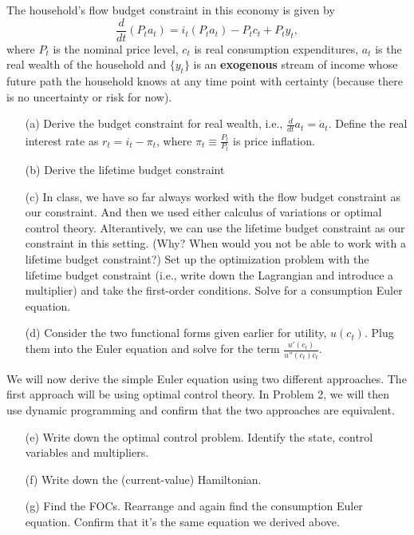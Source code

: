 \documentclass[11pt]{extarticle}
\theoremstyle{plain}
\theoremstyle{definition}
\begin{document}
The household's flow budget constraint in this economy is given by
\begin{equation*}
	\frac{d}{dt}(P_t a_t) = i_t (P_t a_t) - P_t c_t + P_t y_t,
\end{equation*}
where $P_t$ is the nominal price level, $c_t$ is real consumption expenditures, $a_t$ is the real wealth of the household and $\{y_t\}$ is an \textbf{exogenous} stream of income whose future path the household knows at any time point with certainty (because there is no uncertainty or risk for now).


\vspace{5mm}
\begin{enumerate}
\item [(a)] Derive the budget constraint for real wealth, i.e., $\frac{d}{dt} a_t = \dot a_t$. Define the real interest rate as $r_t = i_t - \pi_t$, where $\pi_t \equiv \frac{\dot P_t}{P_t}$ is price inflation.
	
\item [(b)] Derive the lifetime budget constraint
	
\item [(c)] In class, we have so far always worked with the flow budget constraint as our constraint. And then we used either calculus of variations or optimal control theory. Alterantively, we can use the lifetime budget constraint as our constraint in this setting. (Why? When would you not be able to work with a lifetime budget constraint?) Set up the optimization problem with the lifetime budget constraint (i.e., write down the Lagrangian and introduce a multiplier) and take the first-order conditions. Solve for a consumption Euler equation. 
	
\item [(d)] Consider the two functional forms given earlier for utility, $u(c_t)$. Plug them into the Euler equation and solve for the term $\frac{u'(c_t)}{ u''(c_t) c_t}$.
\end{enumerate}


\vspace{6mm}
\noindent
We will now derive the simple Euler equation using two different approaches. The first approach will be using optimal control theory. In Problem 2, we will then use dynamic programming and confirm that the two approaches are equivalent.

\vspace{5mm}
\begin{enumerate}
\item [(e)] Write down the optimal control problem. Identify the state, control variables and multipliers.
	
\item [(f)] Write down the (current-value) Hamiltonian.
	
\item [(g)] Find the FOCs. Rearrange and again find the consumption Euler equation. Confirm that it's the same equation we derived above. 
\end{enumerate}
\end{document}
